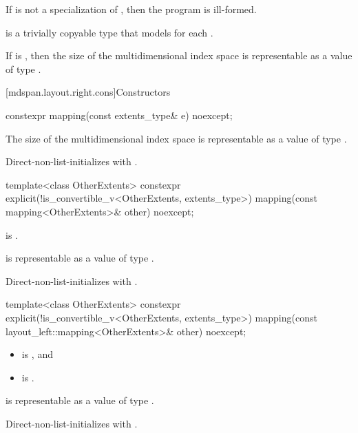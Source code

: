 \pnum
If  is not a specialization of ,
then the program is ill-formed.

\pnum
{} is a trivially copyable type
that models  for each .

\pnum
\mandates
If  is ,
then the size of the multidimensional index space 
is representable as a value of type .

[mdspan.layout.right.cons]{Constructors}

%
\begin{itemdecl}
constexpr mapping(const extents_type& e) noexcept;
\end{itemdecl}

\begin{itemdescr}
\pnum
\expects
The size of the multidimensional index space  is representable as
a value of type .

\pnum
\effects
Direct-non-list-initializes  with .
\end{itemdescr}

%
\begin{itemdecl}
template<class OtherExtents>
  constexpr explicit(!is_convertible_v<OtherExtents, extents_type>)
    mapping(const mapping<OtherExtents>& other) noexcept;
\end{itemdecl}

\begin{itemdescr}
\pnum
\constraints
{} is .

\pnum
\expects
{} is representable as
a value of type .

\pnum
\effects
Direct-non-list-initializes  with .
\end{itemdescr}

%
\begin{itemdecl}
template<class OtherExtents>
  constexpr explicit(!is_convertible_v<OtherExtents, extents_type>)
    mapping(const layout_left::mapping<OtherExtents>& other) noexcept;
\end{itemdecl}

\begin{itemdescr}
\pnum
\constraints
\begin{itemize}
\item
{} is , and
\item
{} is .
\end{itemize}

\pnum
\expects
{} is representable as
a value of type .

\pnum
\effects
Direct-non-list-initializes  with .
\end{itemdescr}

